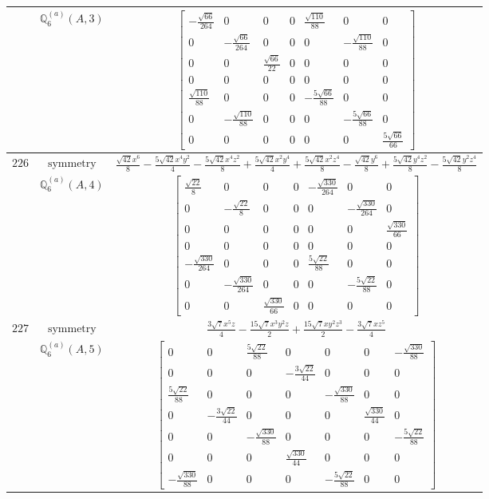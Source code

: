 \documentclass[fleqn,8pt,landscape]{jsarticle}
\begin{document}
\begin{longtable}{ccc}
$  $ & $ \mathbb{Q}_{6}^{(a)}(A,3) $ & $ \begin{bmatrix} - \frac{\sqrt{66}}{264} & 0 & 0 & 0 & \frac{\sqrt{110}}{88} & 0 & 0 \\ 0 & - \frac{\sqrt{66}}{264} & 0 & 0 & 0 & - \frac{\sqrt{110}}{88} & 0 \\ 0 & 0 & \frac{\sqrt{66}}{22} & 0 & 0 & 0 & 0 \\ 0 & 0 & 0 & 0 & 0 & 0 & 0 \\ \frac{\sqrt{110}}{88} & 0 & 0 & 0 & - \frac{5 \sqrt{66}}{88} & 0 & 0 \\ 0 & - \frac{\sqrt{110}}{88} & 0 & 0 & 0 & - \frac{5 \sqrt{66}}{88} & 0 \\ 0 & 0 & 0 & 0 & 0 & 0 & \frac{5 \sqrt{66}}{66} \end{bmatrix} $ \\ \hline
$ 226 $ & $ \text{symmetry} $ & $ \frac{\sqrt{42} x^{6}}{8} - \frac{5 \sqrt{42} x^{4} y^{2}}{4} - \frac{5 \sqrt{42} x^{4} z^{2}}{8} + \frac{5 \sqrt{42} x^{2} y^{4}}{4} + \frac{5 \sqrt{42} x^{2} z^{4}}{8} - \frac{\sqrt{42} y^{6}}{8} + \frac{5 \sqrt{42} y^{4} z^{2}}{8} - \frac{5 \sqrt{42} y^{2} z^{4}}{8} $ \\
$  $ & $ \mathbb{Q}_{6}^{(a)}(A,4) $ & $ \begin{bmatrix} \frac{\sqrt{22}}{8} & 0 & 0 & 0 & - \frac{\sqrt{330}}{264} & 0 & 0 \\ 0 & - \frac{\sqrt{22}}{8} & 0 & 0 & 0 & - \frac{\sqrt{330}}{264} & 0 \\ 0 & 0 & 0 & 0 & 0 & 0 & \frac{\sqrt{330}}{66} \\ 0 & 0 & 0 & 0 & 0 & 0 & 0 \\ - \frac{\sqrt{330}}{264} & 0 & 0 & 0 & \frac{5 \sqrt{22}}{88} & 0 & 0 \\ 0 & - \frac{\sqrt{330}}{264} & 0 & 0 & 0 & - \frac{5 \sqrt{22}}{88} & 0 \\ 0 & 0 & \frac{\sqrt{330}}{66} & 0 & 0 & 0 & 0 \end{bmatrix} $ \\ \hline
$ 227 $ & $ \text{symmetry} $ & $ \frac{3 \sqrt{7} x^{5} z}{4} - \frac{15 \sqrt{7} x^{3} y^{2} z}{2} + \frac{15 \sqrt{7} x y^{2} z^{3}}{2} - \frac{3 \sqrt{7} x z^{5}}{4} $ \\
$  $ & $ \mathbb{Q}_{6}^{(a)}(A,5) $ & $ \begin{bmatrix} 0 & 0 & \frac{5 \sqrt{22}}{88} & 0 & 0 & 0 & - \frac{\sqrt{330}}{88} \\ 0 & 0 & 0 & - \frac{3 \sqrt{22}}{44} & 0 & 0 & 0 \\ \frac{5 \sqrt{22}}{88} & 0 & 0 & 0 & - \frac{\sqrt{330}}{88} & 0 & 0 \\ 0 & - \frac{3 \sqrt{22}}{44} & 0 & 0 & 0 & \frac{\sqrt{330}}{44} & 0 \\ 0 & 0 & - \frac{\sqrt{330}}{88} & 0 & 0 & 0 & - \frac{5 \sqrt{22}}{88} \\ 0 & 0 & 0 & \frac{\sqrt{330}}{44} & 0 & 0 & 0 \\ - \frac{\sqrt{330}}{88} & 0 & 0 & 0 & - \frac{5 \sqrt{22}}{88} & 0 & 0 \end{bmatrix} $ \\ \hline

\end{longtable}
\end{document}
